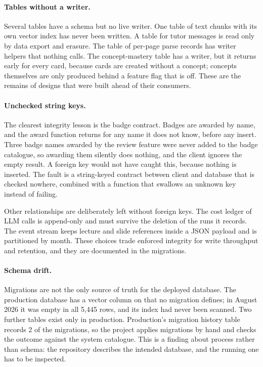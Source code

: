 \paragraph{Tables without a writer.}
Several tables have a schema but no live writer. One table of text chunks with
its own vector index has never been written. A table for tutor messages is read
only by data export and erasure. The table of per-page parse records has writer
helpers that nothing calls. The concept-mastery table has a writer, but it
returns early for every card, because cards are created without a concept;
concepts themselves are only produced behind a feature flag that is off. These
are the remains of designs that were built ahead of their consumers.

\paragraph{Unchecked string keys.}
The clearest integrity lesson is the badge contract. Badges are awarded by name,
and the award function returns  for any name it does not know,
before any insert. Three badge names awarded by the review feature were never
added to the badge catalogue, so awarding them silently does nothing, and the
client ignores the empty result. A foreign key would not have caught this,
because nothing is inserted. The fault is a string-keyed contract between client
and database that is checked nowhere, combined with a function that swallows an
unknown key instead of failing.

Other relationships are deliberately left without foreign keys. The cost ledger
of LLM calls is append-only and must survive the deletion of the runs it
records. The event stream keeps lecture and slide references inside a JSON
payload and is partitioned by month. These choices trade enforced integrity for
write throughput and retention, and they are documented in the migrations.

\paragraph{Schema drift.}
Migrations are not the only source of truth for the deployed database. The
production database has a vector column on  that no migration
defines; in August 2026 it was empty in all 5{,}445 rows, and its index had
never been scanned. Two further tables exist only in production. Production's
migration history table records 2 of the migrations, so the project applies
migrations by hand and checks the outcome against the system catalogue. This is
a finding about process rather than schema: the repository describes the
intended database, and the running one has to be inspected.

